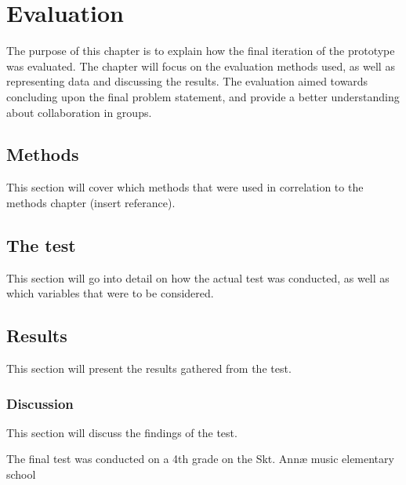 \chapter{Evaluation}

The purpose of this chapter is to explain how the final iteration of the prototype was evaluated. The chapter will focus on the evaluation methods used, as well as representing data and discussing the results. The evaluation aimed towards concluding upon the final problem statement, and provide a better understanding about collaboration in groups.

\section{Methods}
This section will cover which methods that were used in correlation to the methods chapter (insert referance).
\section{The test}
This section will go into detail on how the actual test was conducted, as well as which variables that were to be considered.
\section{Results}
This section will present the results gathered from the test.
\subsection{Discussion}
This section will discuss the findings of the test.

The final test was conducted on a 4th grade on the Skt. Annæ music elementary school


